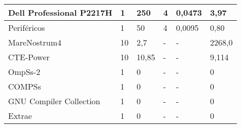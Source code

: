 \begin{longtable}{l|l|l|l|l|l|}
\multicolumn{1}{|l|}{Dell Professional P2217H}                                                                                      & 1                               & 250                     & 4                       & 0,0473                  & 3,97                            \\ \hline
\multicolumn{1}{|l|}{Periféricos}                                                                                                   & 1                               & 50                      & 4                       & 0,0095                  & 0,80                            \\ \hline
\multicolumn{1}{|l|}{MareNostrum4}                                                                                                     & 10                              & 2,7                    & -                       & -                       & 2268,0                          \\ \hline
\multicolumn{1}{|l|}{CTE-Power}                                                                                                     & 10                              & 10,85                   & -                       & -                       & 9,114                            \\ \hline
\multicolumn{1}{|l|}{OmpSs-2}                                                                                                       & 1                               & 0                       & -                       & -                       & 0                               \\ \hline
\multicolumn{1}{|l|}{COMPSs}                                                                                                        & 1                               & 0                       & -                       & -                       & 0                               \\ \hline
\multicolumn{1}{|l|}{GNU Compiler Collection}                                                                                       & 1                               & 0                       & -                       & -                       & 0                               \\ \hline
\multicolumn{1}{|l|}{Extrae}                                                                                                        & 1                               & 0                       & -                       & -                       & 0                               \\ \hline

\end{longtable}
